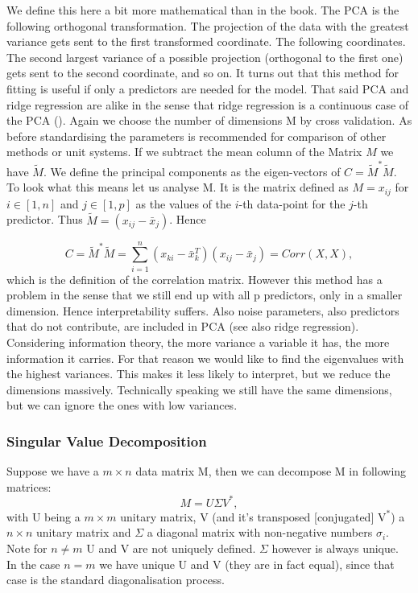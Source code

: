 \documentclass{article}
\begin{document}
 We define this here a bit more mathematical than in the book. The PCA is the following orthogonal transformation. The projection of the data with the greatest variance gets sent to the first transformed coordinate. The following coordinates. The second largest variance of a possible projection (orthogonal to the first one) gets sent to the second coordinate, and so on. It turns out that this method for fitting is useful if only a predictors are needed for the model. That said PCA and ridge regression are alike in the sense that ridge regression is a continuous case of the PCA (\cite{hastie01statisticallearning}). Again we choose the number of dimensions M by cross validation. As before standardising the parameters is recommended for comparison of other methods or unit systems. If we subtract the mean column of the Matrix $M$ we have $\widetilde{M}$. We define the principal components as the eigen-vectors of $C=\widetilde{M}^* \widetilde{M}$. To look what this means let us analyse M. It is the matrix defined as $M=x_{ij}$ for $i\in [1,n]$ and $j\in[1,p]$ as the values of the $i$-th data-point for the $j$-th predictor. Thus $\widetilde{M}= (x_{ij}-\bar{x}_j)$. Hence
 
 \begin{equation}
     C= \widetilde{M}^* \widetilde{M} = \sum_{i=1}^n(x_{ki}-\bar{x}_k^T)(x_{ij}-\bar{x}_j)=Corr(X,X),
 \end{equation}
 which is the definition of the correlation matrix.
 However this method has a problem in the sense that we still end up with all p predictors, only in a smaller dimension. Hence interpretability suffers. Also noise parameters, also predictors that do not contribute, are included in PCA (see also ridge regression).
 Considering information theory, the more variance a variable it has, the more information it carries. For that reason we would like to find the eigenvalues with the highest variances. This makes it less likely to interpret, but we reduce the dimensions massively. Technically speaking we still have the same dimensions, but we can ignore the ones with low variances.
 
 \subsubsection{Singular Value Decomposition}

 Suppose we have a $m \times n$ data matrix M, then we can decompose M in following matrices:
 \begin{equation}
     M = U \Sigma V^*,
 \end{equation}
 with U being a $m \times m$ unitary matrix, V (and it's transposed [conjugated] $\text{V}^*$) a $n \times n$ unitary matrix and $\Sigma$ a diagonal matrix with non-negative numbers $\sigma_i$. Note for $n \neq m$ U and V are not uniquely defined. $\Sigma$ however is always unique. In the case $n=m$ we have unique U and V (they are in fact equal), since that case is the standard diagonalisation process. 
 
\end{document}
